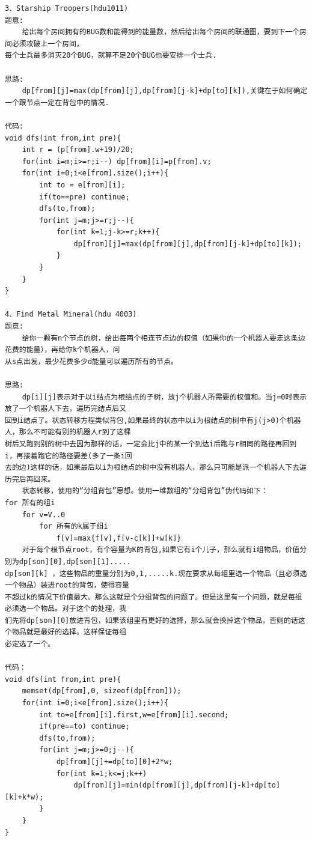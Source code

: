 \documentclass[twoside]{article}
\begin{document}
\begin{lstlisting}
3、Starship Troopers(hdu1011)
题意:
    给出每个房间拥有的BUG数和能得到的能量数，然后给出每个房间的联通图，要到下一个房间必须攻破上一个房间，
每个士兵最多消灭20个BUG，就算不足20个BUG也要安排一个士兵.

思路:
    dp[from][j]=max(dp[from][j],dp[from][j-k]+dp[to][k]),关键在于如何确定一个跟节点一定在背包中的情况.

代码:
void dfs(int from,int pre){
    int r = (p[from].w+19)/20;
    for(int i=m;i>=r;i--) dp[from][i]=p[from].v;
    for(int i=0;i<e[from].size();i++){
        int to = e[from][i];
        if(to==pre) continue;
        dfs(to,from);
        for(int j=m;j>=r;j--){
            for(int k=1;j-k>=r;k++){
                dp[from][j]=max(dp[from][j],dp[from][j-k]+dp[to][k]);
            }
        }
    }
}

4、Find Metal Mineral(hdu 4003)
题意:
    给你一颗有n个节点的树，给出每两个相连节点边的权值（如果你的一个机器人要走这条边花费的能量），再给你k个机器人，问
从s点出发，最少花费多少d能量可以遍历所有的节点。

思路:
    dp[i][j]表示对于以i结点为根结点的子树，放j个机器人所需要的权值和。当j=0时表示放了一个机器人下去，遍历完结点后又
回到i结点了。状态转移方程类似背包,如果最终的状态中以i为根结点的树中有j(j>0)个机器人，那么不可能有别的机器人r到了这棵
树后又跑到别的树中去因为那样的话，一定会比j中的某一个到达i后跑与r相同的路径再回到i，再接着跑它的路径要差(多了一条i回
去的边)这样的话，如果最后以i为根结点的树中没有机器人，那么只可能是派一个机器人下去遍历完后再回来。
    状态转移，使用的“分组背包”思想。使用一维数组的“分组背包”伪代码如下：
for 所有的组i
    for v=V..0
        for 所有的k属于组i
            f[v]=max{f[v],f[v-c[k]]+w[k]}
    对于每个根节点root，有个容量为K的背包,如果它有i个儿子，那么就有i组物品，价值分别为dp[son][0],dp[son][1].....
dp[son][k] ，这些物品的重量分别为0,1,.....k.现在要求从每组里选一个物品（且必须选一个物品）装进root的背包，使得容量
不超过k的情况下价值最大。那么这就是个分组背包的问题了。但是这里有一个问题，就是每组必须选一个物品。对于这个的处理，我
们先将dp[son][0]放进背包，如果该组里有更好的选择，那么就会换掉这个物品，否则的话这个物品就是最好的选择。这样保证每组
必定选了一个。

代码：
void dfs(int from,int pre){
    memset(dp[from],0, sizeof(dp[from]));
    for(int i=0;i<e[from].size();i++){
        int to=e[from][i].first,w=e[from][i].second;
        if(pre==to) continue;
        dfs(to,from);
        for(int j=m;j>=0;j--){
            dp[from][j]+=dp[to][0]+2*w;
            for(int k=1;k<=j;k++)
                dp[from][j]=min(dp[from][j],dp[from][j-k]+dp[to][k]+k*w);
        }
    }
}


\end{lstlisting}
\end{document}
